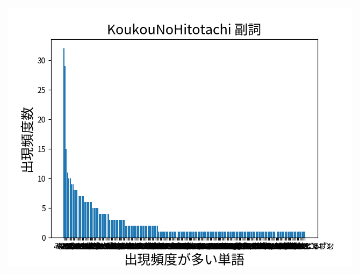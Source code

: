 \documentclass[onecolumn]{ujarticle}   %
\begin{document}
\begin{figure}[hb]
\begin{subfigure}{0.49\columnwidth}
			\includegraphics[width=1.0\columnwidth]{data/hukusi_KoukouNoHitotachi.png}
		\end{subfigure}
		\label{fig:histgram2}
	\end{figure}
\end{document}
